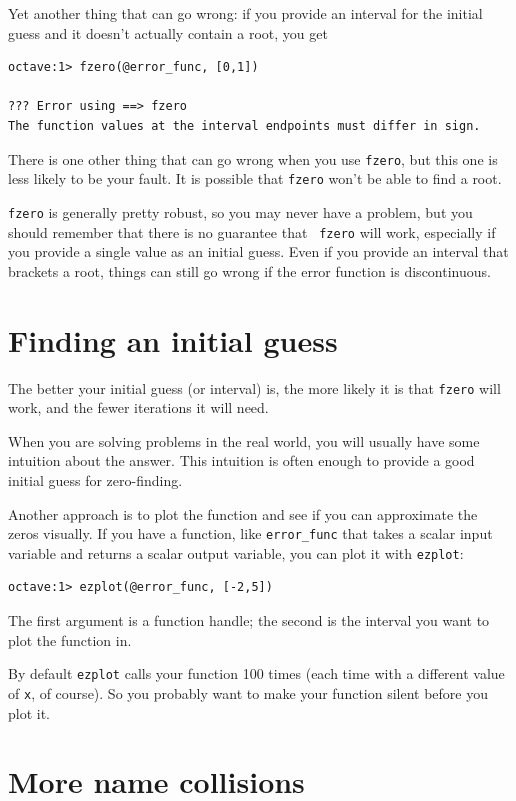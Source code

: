 \documentclass{book}
\begin{document}
Yet another thing that can go wrong: if you provide an interval for the
initial guess and it doesn't actually contain a root, you get

\begin{verbatim}
octave:1> fzero(@error_func, [0,1])

??? Error using ==> fzero
The function values at the interval endpoints must differ in sign.
\end{verbatim}

There is one other thing that can go wrong when you use {\tt fzero}, but
this one is less likely to be your fault. It is possible that {\tt fzero}
won't be able to find a root.

{\tt fzero} is generally pretty robust, so you may never have a
problem, but you should remember that there is no guarantee that {\tt
fzero} will work, especially if you provide a single value as an
initial guess. Even if you provide an interval that brackets a root,
things can still go wrong if the error function is discontinuous.


\section{Finding an initial guess}

The better your initial guess (or interval) is, the more likely
it is that {\tt fzero} will work, and the fewer iterations it will
need.

When you are solving problems in the real world, you will usually
have some intuition about the answer. This intuition is often enough
to provide a good initial guess for zero-finding.

Another approach is to plot the function and see if you can
approximate the zeros visually. If you have a function, like
{\tt error\_func} that takes a scalar input variable and returns
a scalar output variable, you can plot it with {\tt ezplot}:

\begin{verbatim}
octave:1> ezplot(@error_func, [-2,5])
\end{verbatim}

The first argument is a function handle; the second is the 
interval you want to plot the function in.

By default {\tt ezplot} calls your function 100 times (each time
with a different value of {\tt x}, of course). So you probably want
to make your function silent before you plot it.

\section{More name collisions}
\end{document}
